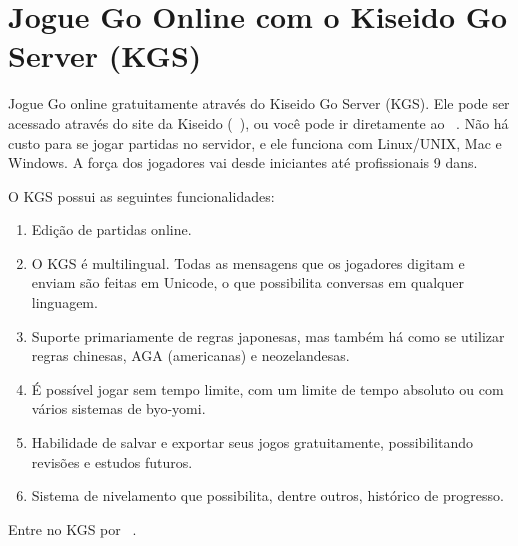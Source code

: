 \chapter{Jogue Go Online com o Kiseido Go Server (KGS)}

Jogue Go online gratuitamente através do Kiseido Go Server (KGS). Ele pode ser acessado através do site da Kiseido (\href{https://www.kiseido.com}{}~\cite{kiseido}), ou você pode ir diretamente ao \href{https://www.gokgs.com}{}~\cite{kgs}. Não há custo para se jogar partidas no servidor, e ele funciona com Linux/UNIX, Mac e Windows. A força dos jogadores vai desde iniciantes até profissionais 9 dans.

O KGS possui as seguintes funcionalidades:

\begin{enumerate}
    \item Edição de partidas online.
    \item O KGS é multilingual. Todas as mensagens que os jogadores digitam e enviam são feitas em Unicode, o que possibilita conversas em qualquer linguagem.
    \item Suporte primariamente de regras japonesas, mas também há como se utilizar regras chinesas, AGA (americanas) e neozelandesas.
    \item É possível jogar sem tempo limite, com um limite de tempo absoluto ou com vários sistemas de byo-yomi.
    \item Habilidade de salvar e exportar seus jogos gratuitamente, possibilitando revisões e estudos futuros.
    \item Sistema de nivelamento que possibilita, dentre outros, histórico de progresso. 
\end{enumerate}

Entre no KGS por \href{https://www.gokgs.com}{}~\cite{kgs}.